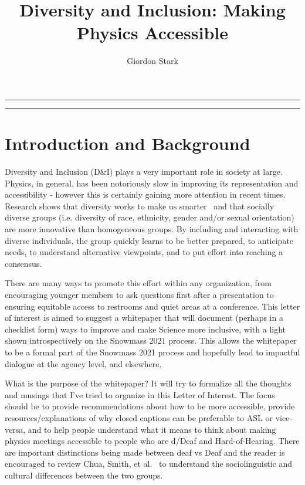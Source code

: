 \documentclass{article}
\title{Diversity and Inclusion: Making Physics Accessible}
\author[a]{Giordon Stark}
\affil[a]{SCIPP, UC Santa Cruz}
\date{}
\begin{document}
  \maketitle
  \hrule
  \vspace{0.5em}
  \hrule
  \vspace{2.5em}
  \section{Introduction and Background}
  Diversity and Inclusion (D\&I) plays a very important role in society at large. Physics, in general, has been notoriously slow in improving its representation and accessibility - however this is certainly gaining more attention in recent times. Research shows that diversity works to make us smarter~\cite{HowDiversityWorks} and that socially diverse groups (i.e. diversity of race, ethnicity, gender and/or sexual orientation) are more innovative than homogeneous groups. By including and interacting with diverse individuals, the group quickly learns to be better prepared, to anticipate needs, to understand alternative viewpoints, and to put effort into reaching a consensus.

  There are many ways to promote this effort within any organization, from encouraging younger members to ask questions first after a presentation to ensuring equitable access to restrooms and quiet areas at a conference. This letter of interest is aimed to suggest a whitepaper that will document (perhaps in a checklist form) ways to improve and make Science more inclusive, with a light shown introspectively on the Snowmass 2021 process. This allows the whitepaper to be a formal part of the Snowmass 2021 process and hopefully lead to impactful dialogue at the agency level, and elsewhere.


  What is the purpose of the whitepaper? It will try to formalize all the thoughts and musings that I've tried to organize in this Letter of Interest. The focus should be to provide recommendations about how to be more accessible, provide resources/explanations of why closed captions can be preferable to ASL or vice-versa, and to help people understand what it means to think about making physics meetings accessible to people who are d/Deaf and Hard-of-Hearing. There are important distinctions being made between deaf vs Deaf and the reader is encouraged to review Chua, Smith, et al.~\cite{asee_peer_32676} to understand the sociolinguistic and cultural differences between the two groups.
\end{document}
